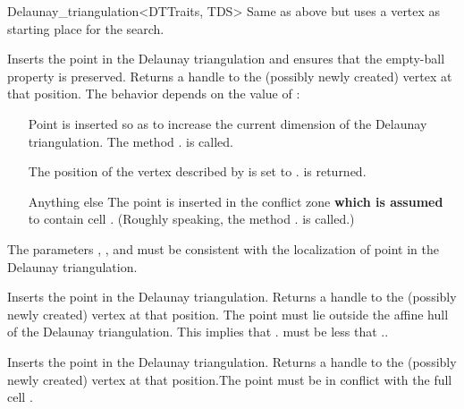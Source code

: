 \begin{ccRefClass}{Delaunay_triangulation<DTTraits, TDS>}
%
{Same as above but uses a vertex as starting place for the search.}

\begin{ccAdvanced}

{Inserts the point  in the Delaunay triangulation
and ensures that the empty-ball property is preserved.
Returns a handle to the
(possibly newly created) vertex at that position. The behavior depends on the
value of :\begin{itemize} \item[\ccc{OUTSIDE_AFFINE_HULL}] Point
 is inserted so as to increase the current dimension of the Delaunay
triangulation. The method \ccVar. is called.
\item[\ccc{ON_VERTEX}] The position of the vertex  described by 
is set to .  is returned. \item[Anything else] The point 
is inserted in the conflict zone \textbf{which is assumed} to contain cell
. (Roughly speaking, the method \ccVar.
is called.)\end{itemize} \ccPrecond The parameters , , 
and  must be consistent with the localization of point  in the
Delaunay triangulation.}

{Inserts the point  in the Delaunay triangulation. Returns a handle to the
(possibly newly created) vertex at that position. \ccPrecond The point 
must lie outside the affine hull of the Delaunay triangulation. This implies that
\ccVar. must be less that
\ccVar..}

{Inserts the point  in the Delaunay triangulation. Returns a handle to the
(possibly newly created) vertex at that position.\ccPrecond The point 
must be in conflict with the full cell .}

\end{ccAdvanced}




\end{ccRefClass}
